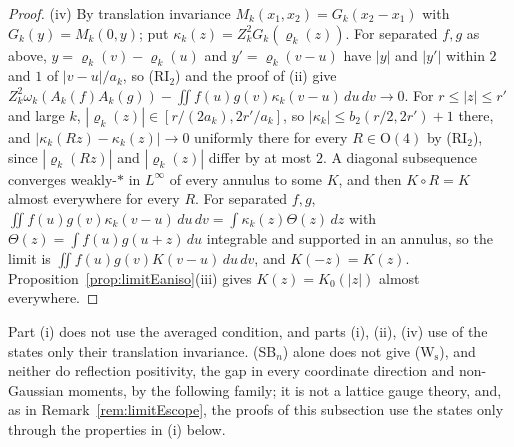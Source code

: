 \documentclass[aps,prd,twocolumn,superscriptaddress,nofootinbib,longbibliography,floatfix,amsmath,amssymb,10pt]{revtex4-2}
\theoremstyle{definition}
\theoremstyle{remark}
\begin{document}
\begin{proof}
(iv) By translation invariance $M_k(x_1,x_2)=G_k(x_2-x_1)$ with
$G_k(y)=M_k(0,y)$; put $\kappa_k(z)=Z_k^2G_k(\varrho_k(z))$. For separated
$f,g$ as above, $y=\varrho_k(v)-\varrho_k(u)$ and $y'=\varrho_k(v-u)$ have
$|y|$ and $|y'|$ within $2$ and $1$ of $|v-u|/a_k$, so (RI$_2$) and the
proof of (ii) give $Z_k^2\omega_k(A_k(f)A_k(g))-\iint f(u)g(v)\kappa_k(v-u)
\,du\,dv\to0$. For $r\le|z|\le r'$ and large $k$, $|\varrho_k(z)|\in[r/(2a_k),
2r'/a_k]$, so $|\kappa_k|\le b_2(r/2,2r')+1$ there, and $|\kappa_k(Rz)-
\kappa_k(z)|\to0$ uniformly there for every $R\in\mathrm O(4)$ by (RI$_2$),
since $|\varrho_k(Rz)|$ and $|\varrho_k(z)|$ differ by at most $2$. A
diagonal subsequence converges weakly-$*$ in $L^\infty$ of every annulus
to some $K$, and then $K\circ R=K$ almost everywhere for every $R$. For
separated $f,g$, $\iint f(u)g(v)\kappa_k(v-u)\,du\,dv=\int\kappa_k(z)
\Theta(z)\,dz$ with $\Theta(z)=\int f(u)g(u+z)\,du$ integrable and
supported in an annulus, so the limit is $\iint f(u)g(v)K(v-u)\,du\,dv$, and
$K(-z)=K(z)$. Proposition~\ref{prop:limitEaniso}(iii) gives $K(z)=K_0(|z|)$
almost everywhere.
\end{proof}

Part (i) does not use the averaged condition, and parts (i), (ii), (iv) use
of the states only their translation invariance. (SB$_n$) alone does not
give (W$_{\mathrm s}$), and neither do reflection positivity, the gap in
every coordinate direction and non-Gaussian moments, by the following
family; it is not a lattice gauge theory, and, as in
Remark~\ref{rem:limitEscope}, the proofs of this subsection use the states
only through the properties in (i) below.
\end{document}
